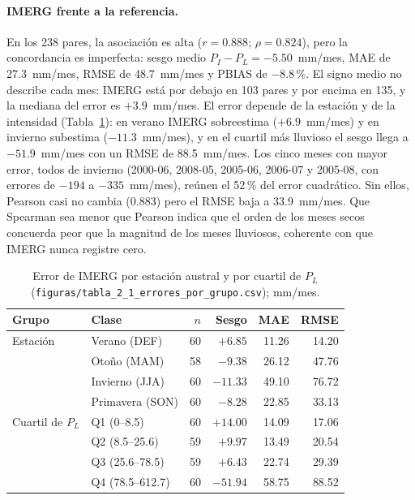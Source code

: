 \documentclass[11pt,a4paper]{article}
\newcommand{\archivo}[1]{\nolinkurl{#1}}
\newcommand{\PL}{P_L}
\newcommand{\PI}{P_I}
\begin{document}
\paragraph{IMERG frente a la referencia.} En los 238 pares, la asociación es alta ($r=0.888$; $\rho=0.824$), pero la concordancia es imperfecta: sesgo medio $\PI-\PL=-5.50$~mm/mes, MAE de 27.3~mm/mes, RMSE de 48.7~mm/mes y PBIAS de $-8.8$\,\%. El signo medio no describe cada mes: IMERG está por debajo en 103 pares y por encima en 135, y la mediana del error es $+3.9$~mm/mes. El error depende de la estación y de la intensidad (Tabla~\ref{tab:errgrupo}): en verano IMERG sobreestima ($+6.9$~mm/mes) y en invierno subestima ($-11.3$~mm/mes), y en el cuartil más lluvioso el sesgo llega a $-51.9$~mm/mes con un RMSE de 88.5~mm/mes. Los cinco meses con mayor error, todos de invierno (2000-06, 2008-05, 2005-06, 2006-07 y 2005-08, con errores de $-194$ a $-335$~mm/mes), reúnen el 52\,\% del error cuadrático. Sin ellos, Pearson casi no cambia (0.883) pero el RMSE baja a 33.9~mm/mes. Que Spearman sea menor que Pearson indica que el orden de los meses secos concuerda peor que la magnitud de los meses lluviosos, coherente con que IMERG nunca registre cero.

\begin{table}[H]
\centering\small
\caption{Error de IMERG por estación austral y por cuartil de $\PL$ (\archivo{figuras/tabla_2_1_errores_por_grupo.csv}); mm/mes.}
\label{tab:errgrupo}
\begin{tabular}{llrrrr}
\toprule
Grupo & Clase & $n$ & Sesgo & MAE & RMSE \\
\midrule
Estación & Verano (DEF) & 60 & $+6.85$ & 11.26 & 14.20 \\
 & Otoño (MAM) & 58 & $-9.38$ & 26.12 & 47.76 \\
 & Invierno (JJA) & 60 & $-11.33$ & 49.10 & 76.72 \\
 & Primavera (SON) & 60 & $-8.28$ & 22.85 & 33.13 \\
Cuartil de $\PL$ & Q1 (0--8.5) & 60 & $+14.00$ & 14.09 & 17.06 \\
 & Q2 (8.5--25.6) & 59 & $+9.97$ & 13.49 & 20.54 \\
 & Q3 (25.6--78.5) & 59 & $+6.43$ & 22.74 & 29.39 \\
 & Q4 (78.5--612.7) & 60 & $-51.94$ & 58.75 & 88.52 \\
\bottomrule
\end{tabular}
\end{table}
\end{document}
